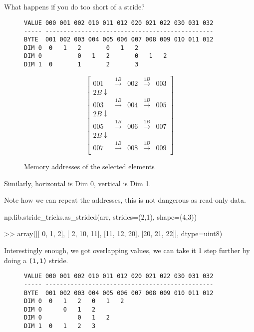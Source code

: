 \documentclass[oneside, 12pt]{report}
\begin{document}
What happens if you do too short of a stride?

\begin{figure}[H]
\begin{verbatim}
VALUE 000 001 002 010 011 012 020 021 022 030 031 032
----- -----------------------------------------------
BYTE  001 002 003 004 005 006 007 008 009 010 011 012
DIM 0  0   1   2       0   1   2  
DIM 0          0   1   2       0   1   2 
DIM 1  0       1       2       3 
\end{verbatim}
\end{figure}

\begin{figure}[H]
\begin{equation*}
\begin{bmatrix}
001 & \xrightarrow{1B} & 002 &\xrightarrow{1B} & 003 \\
2B \downarrow \\
003 & \xrightarrow{1B} & 004 &\xrightarrow{1B} & 005 \\
2B \downarrow \\
005 & \xrightarrow{1B} & 006 &\xrightarrow{1B} & 007 \\
2B \downarrow \\
007 & \xrightarrow{1B} & 008 &\xrightarrow{1B} & 009 \\
\end{bmatrix}
\end{equation*}
\caption{Memory addresses of the selected elements}
\end{figure}

\begin{shaded}
Similarly, horizontal is Dim 0, vertical is Dim 1.

Note how we can repeat the addresses, this is not dangerous as read-only data.
\end{shaded}

\begin{python}
np.lib.stride_tricks.as_strided(arr, strides=(2,1), shape=(4,3))

>> array([[ 0,  1,  2],
          [ 2, 10, 11],
          [11, 12, 20],
          [20, 21, 22]], dtype=uint8)
\end{python}

Interestingly enough, we got overlapping values, we can take it 1 step further by doing a \verb+(1,1)+ stride.

\begin{figure}[H]
\begin{verbatim}
VALUE 000 001 002 010 011 012 020 021 022 030 031 032
----- -----------------------------------------------
BYTE  001 002 003 004 005 006 007 008 009 010 011 012
DIM 0  0   1   2   0   1   2    
DIM 0      0   1   2 
DIM 0          0   1   2 
DIM 1  0   1   2   3 
\end{verbatim}
\end{figure}
\end{document}
